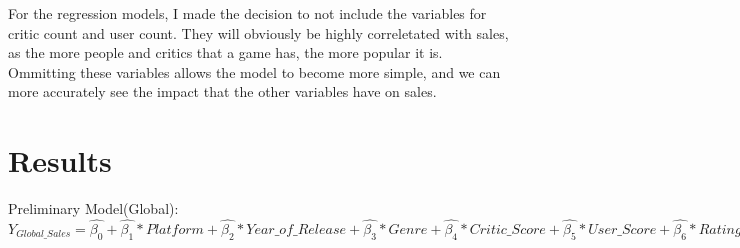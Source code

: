 \documentclass[12pt]{article}
\begin{document}
For the regression models, I made the decision to not include the variables for critic count and user count. 
They will obviously be highly correletated with sales, as the more people and critics that a game has, the more popular it is.
Ommitting these variables allows the model to become more simple, and we can more accurately see the impact that the other
variables have on sales.

\section{Results}
\label{sec:resu}
Preliminary Model(Global):
$Y_{Global\_Sales}=\hat{\beta_{0}}+\hat{\beta_{1}}*Platform+\hat{\beta_{2}}*Year\_of\_Release+\hat{\beta_{3}}*Genre+\hat{\beta_{4}}*Critic\_Score+\hat{\beta_{5}}*User\_Score+\hat{\beta_{6}}*Rating$
\end{document}
